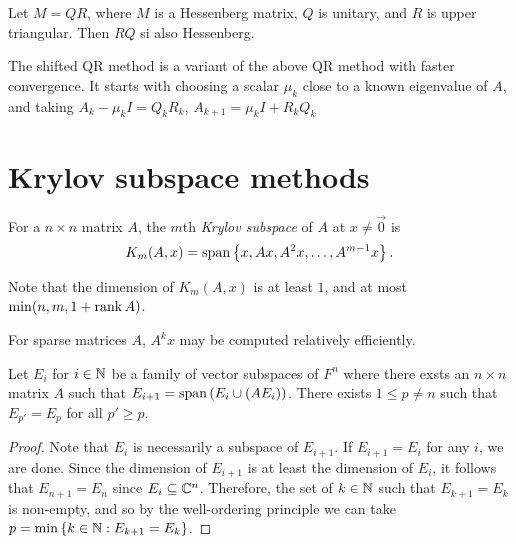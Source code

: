 \begin{prop}\label{hessenberg-qr-swap}
    Let $M = QR$, where $M$ is a Hessenberg matrix, $Q$ is unitary, and $R$ is upper triangular. Then $RQ$ si also Hessenberg.
\end{prop}

\begin{defn}
    The shifted QR method is a variant of the above QR method with faster convergence. It starts with choosing a scalar $\mu_k$ close to a known eigenvalue of $A$, and taking $A_{k} - \mu_kI = Q_{k}R_{k}$, $A_{k+1} = \mu_kI + R_{k}Q_{k}$
\end{defn}

\section{Krylov subspace methods}

\begin{defn}
    For a $n \times n$ matrix $A$, the $m$th \emph{Krylov subspace} of $A$ at $x \neq \vec{0}$ is
    \begin{align*}
        K_m(A, x) = \operatorname{span}\left\{x, Ax, A^2x, \ldots, A^{m-1}x\right\}.
    \end{align*}
\end{defn}

\begin{rmk}
    Note that the dimension of $K_m(A, x)$ is at least $1$, and at most $\min(n, m, 1 + \operatorname{rank} A)$.
\end{rmk}

\begin{rmk}
    For sparse matrices $A$, $A^{k}x$ may be computed relatively efficiently.
\end{rmk}

\begin{lemma}
    Let $E_i$ for $i \in \mathbb{N}$ be a family of vector subspaces of $F^n$ where there exsts an $n \times n$ matrix $A$ such that $E_{i+1} = \operatorname{span}\left(E_i \cup \left(AE_i\right)\right)$. There exists $1 \leq p \neq n$ such that $E_{p'} = E_p$ for all $p' \geq p$.
\end{lemma}

\begin{proof}
    Note that $E_i$ is necessarily a subspace of $E_{i+1}$. If $E_{i+1} = E_i$ for any $i$, we are done. Since the dimension of $E_{i+1}$ is at least the dimension of $E_i$, it follows that $E_{n+1} = E_n$ since $E_i \subseteq \mathbb{C}^n$. Therefore, the set of $k \in \mathbb{N}$ such that $E_{k+1} = E_k$ is non-empty, and so by the well-ordering principle we can take $p = \min\left\{k \in \mathbb{N} : E_{k+1} = E_k\right\}$.
\end{proof}

